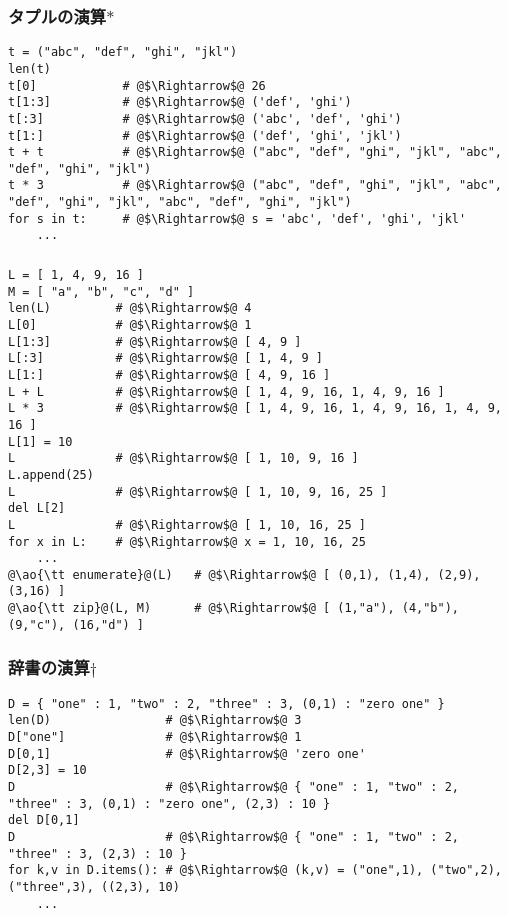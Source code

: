 \documentclass[landscape,7pt,dvipdfmx]{article}
\newcommand{\ao}[1]{{\color{blue}{#1}}}
\begin{document}
\begin{multicols*}{3}
\subsubsection{タプルの演算$\ast$}
\begin{lstlisting}
t = ("abc", "def", "ghi", "jkl")
len(t)
t[0]            # @$\Rightarrow$@ 26
t[1:3]          # @$\Rightarrow$@ ('def', 'ghi')
t[:3]           # @$\Rightarrow$@ ('abc', 'def', 'ghi')
t[1:]           # @$\Rightarrow$@ ('def', 'ghi', 'jkl')
t + t           # @$\Rightarrow$@ ("abc", "def", "ghi", "jkl", "abc", "def", "ghi", "jkl")
t * 3           # @$\Rightarrow$@ ("abc", "def", "ghi", "jkl", "abc", "def", "ghi", "jkl", "abc", "def", "ghi", "jkl")
for s in t:     # @$\Rightarrow$@ s = 'abc', 'def', 'ghi', 'jkl'
    ...
\end{lstlisting}

\subsubsection{\ao{リストの演算}}
\begin{lstlisting}
L = [ 1, 4, 9, 16 ]
M = [ "a", "b", "c", "d" ]
len(L)         # @$\Rightarrow$@ 4
L[0]           # @$\Rightarrow$@ 1
L[1:3]         # @$\Rightarrow$@ [ 4, 9 ]
L[:3]          # @$\Rightarrow$@ [ 1, 4, 9 ]
L[1:]          # @$\Rightarrow$@ [ 4, 9, 16 ]
L + L          # @$\Rightarrow$@ [ 1, 4, 9, 16, 1, 4, 9, 16 ]
L * 3          # @$\Rightarrow$@ [ 1, 4, 9, 16, 1, 4, 9, 16, 1, 4, 9, 16 ]
L[1] = 10      
L              # @$\Rightarrow$@ [ 1, 10, 9, 16 ]
L.append(25)   
L              # @$\Rightarrow$@ [ 1, 10, 9, 16, 25 ]
del L[2]
L              # @$\Rightarrow$@ [ 1, 10, 16, 25 ]
for x in L:    # @$\Rightarrow$@ x = 1, 10, 16, 25
    ...
@\ao{\tt enumerate}@(L)   # @$\Rightarrow$@ [ (0,1), (1,4), (2,9), (3,16) ]
@\ao{\tt zip}@(L, M)      # @$\Rightarrow$@ [ (1,"a"), (4,"b"), (9,"c"), (16,"d") ]
\end{lstlisting}

\subsubsection{辞書の演算$\dagger$}
\begin{lstlisting}
D = { "one" : 1, "two" : 2, "three" : 3, (0,1) : "zero one" }
len(D)                # @$\Rightarrow$@ 3
D["one"]              # @$\Rightarrow$@ 1
D[0,1]                # @$\Rightarrow$@ 'zero one'
D[2,3] = 10    
D                     # @$\Rightarrow$@ { "one" : 1, "two" : 2, "three" : 3, (0,1) : "zero one", (2,3) : 10 }
del D[0,1]
D                     # @$\Rightarrow$@ { "one" : 1, "two" : 2, "three" : 3, (2,3) : 10 }
for k,v in D.items(): # @$\Rightarrow$@ (k,v) = ("one",1), ("two",2), ("three",3), ((2,3), 10)
    ...
\end{lstlisting}


\end{multicols*}
\end{document}
